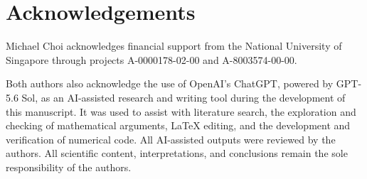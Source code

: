 \documentclass[11pt]{article}
\newcommand{\1}{\mathbf{1}}
\begin{document}
\section*{Acknowledgements}

Michael Choi acknowledges financial support from the National University
of Singapore through projects A-0000178-02-00 and A-8003574-00-00.

Both authors also acknowledge the use of OpenAI's ChatGPT, powered by
GPT-5.6 Sol, as an AI-assisted research and writing tool during the
development of this manuscript.  It was used to assist with literature
search, the exploration and checking of mathematical arguments,
\LaTeX{} editing, and the development and verification of numerical
code.  All AI-assisted outputs were reviewed by the authors. All scientific content, interpretations, and conclusions remain the sole responsibility of the authors.



\end{document}
